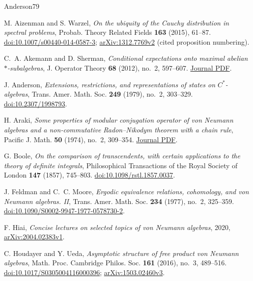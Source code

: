 \begin{thebibliography}{Anderson79}
\raggedright

M. Aizenman and S. Warzel,
\emph{On the ubiquity of the Cauchy distribution in spectral problems},
Probab. Theory Related Fields \textbf{163} (2015), 61--87.
\href{https://doi.org/10.1007/s00440-014-0587-3}{doi:10.1007/s00440-014-0587-3};
\href{https://arxiv.org/abs/1312.7769v2}{arXiv:1312.7769v2}
(cited proposition numbering).

C.~A. Akemann and D. Sherman,
\emph{Conditional expectations onto maximal abelian $*$-subalgebras},
J. Operator Theory \textbf{68} (2012), no.~2, 597--607.
\href{https://jot.theta.ro/jot/archive/2012-068-002/2012-068-002-013.pdf}{Journal PDF}.

J. Anderson,
\emph{Extensions, restrictions, and representations of states on
\(C^*\)-algebras},
Trans. Amer. Math. Soc. \textbf{249} (1979), no.~2, 303--329.
\href{https://doi.org/10.2307/1998793}{doi:10.2307/1998793}.

H. Araki,
\emph{Some properties of modular conjugation operator of von Neumann algebras
and a non-commutative Radon--Nikodym theorem with a chain rule},
Pacific J. Math. \textbf{50} (1974), no.~2, 309--354.
\href{https://msp.org/pjm/1974/50-2/pjm-v50-n2-p02-p.pdf}{Journal PDF}.

G. Boole,
\emph{On the comparison of transcendents, with certain applications to the
theory of definite integrals},
Philosophical Transactions of the Royal Society of London \textbf{147}
(1857), 745--803.
\href{https://doi.org/10.1098/rstl.1857.0037}{doi:10.1098/rstl.1857.0037}.

J. Feldman and C.~C. Moore,
\emph{Ergodic equivalence relations, cohomology, and von Neumann algebras. II},
Trans. Amer. Math. Soc. \textbf{234} (1977), no.~2, 325--359.
\href{https://doi.org/10.1090/S0002-9947-1977-0578730-2}{doi:10.1090/S0002-9947-1977-0578730-2}.

F. Hiai,
\emph{Concise lectures on selected topics of von Neumann algebras},
2020, \href{https://arxiv.org/abs/2004.02383v1}{arXiv:2004.02383v1}.

C. Houdayer and Y. Ueda,
\emph{Asymptotic structure of free product von Neumann algebras},
Math. Proc. Cambridge Philos. Soc. \textbf{161} (2016), no.~3, 489--516.
\href{https://doi.org/10.1017/S0305004116000396}{doi:10.1017/S0305004116000396};
\href{https://arxiv.org/abs/1503.02460v3}{arXiv:1503.02460v3}.


\end{thebibliography}
